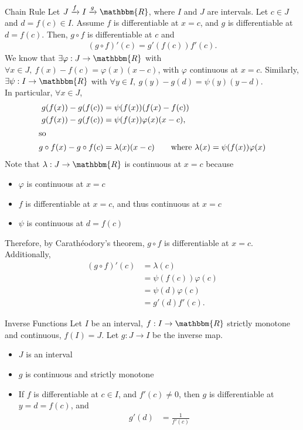 \documentclass[10pt]{extarticle}
\newcommand{\R}{\mathbbm{R}}
\begin{document}
  \begin{problem}{Chain Rule}
    Let $J\xrightarrow{f} I \xrightarrow{g} \R$, where $I$ and $J$ are intervals. Let $c\in J$ and $d = f(c)\in I$. Assume $f$ is differentiable at $x=c$, and $g$ is differentiable at $d = f(c)$. Then, $g\circ f$ is differentiable at $c$ and
    \begin{align*}
      (g\circ f)'(c) = g'(f(c))f'(c).
    \end{align*}
    \tcblower
    We know that $\exists \varphi: J\rightarrow \R$ with $\forall x\in J,~f(x)-f(c) = \varphi(x)(x-c)$, with $\varphi$ continuous at $x=c$. Similarly, $\exists \psi: I\rightarrow \R$ with $\forall y\in I,~g(y)-g(d) = \psi(y)(y-d)$.\\

    In particular, $\forall x\in J$,
    \begin{align*}
      g(f(x)) - g(f(c)) &= \psi(f(x))(f(x) - f(c))\\
      g(f(x)) - g(f(c)) &= \psi(f(x))\varphi(x)(x-c),\\
      \shortintertext{so}
      g\circ f(x) - g\circ f(c) &= \lambda(x)(x-c) \tag*{where $\lambda(x) = \psi(f(x))\varphi(x)$}
    \end{align*}
    Note that $\lambda: J\rightarrow \R$ is continuous at $x=c$ because
    \begin{itemize}
      \item $\varphi$ is continuous at $x=c$
      \item $f$ is differentiable at $x=c$, and thus continuous at $x=c$
      \item $\psi$ is continuous at $d = f(c)$
    \end{itemize}
    Therefore, by Carathéodory's theorem, $g\circ f$ is differentiable at $x=c$.\\

    Additionally,
    \begin{align*}
      \left(g\circ f\right)'(c) &= \lambda(c)\\
                                &= \psi(f(c))\varphi(c)\\
                                &= \psi(d)\varphi(c)\\
                                &= g'(d)f'(c).
    \end{align*}
  \end{problem}
  \begin{problem}{Inverse Functions}
    Let $I$ be an interval, $f: I\rightarrow \R$ strictly monotone and continuous, $f(I) = J$. Let $g: J\rightarrow I$ be the inverse map.
    \begin{itemize}
      \item $J$ is an interval
      \item $g$ is continuous and strictly monotone
      \item If $f$ is differentiable at $c\in I$, and $f'(c) \neq 0$, then $g$ is differentiable at $y = d = f(c)$, and
        \begin{align*}
          g'(d) &= \frac{1}{f'(c)}
        \end{align*}
    \end{itemize}
  \end{problem}
\end{document}
